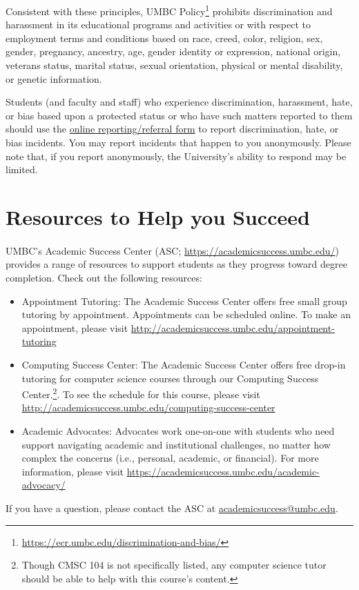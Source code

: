 \documentclass[letter,10pt]{article}
\begin{document}
Consistent with these principles, UMBC Policy\footnote{\url{https://ecr.umbc.edu/discrimination-and-bias/}} prohibits discrimination and harassment in its educational programs and activities or with respect to employment terms and conditions based on race, creed, color, religion, sex, gender, pregnancy, ancestry, age, gender identity or expression, national origin, veterans status, marital status, sexual orientation, physical or mental disability, or genetic information.

Students (and faculty and staff) who experience discrimination, harassment, hate, or bias based upon a protected status or who have such matters reported to them should use the \href{https://umbc-advocate.symplicity.com/titleix_report/index.php/pid954154?}{online reporting/referral form} to report discrimination, hate, or bias incidents. You may report incidents that happen to you anonymously. Please note that, if you report anonymously, the University’s ability to respond may be limited.

\section*{Resources to Help you Succeed}
\paragraph{}UMBC’s Academic Success Center (ASC; \url{https://academicsuccess.umbc.edu/}) provides a range of resources to support students as they progress toward degree completion. Check out the following resources:

\begin{itemize}
\item Appointment Tutoring: The Academic Success Center offers free small group tutoring by appointment. Appointments can be scheduled online. To make an appointment, please visit \url{http://academicsuccess.umbc.edu/appointment-tutoring}

\item Computing Success Center: The Academic Success Center offers free drop-in tutoring for computer science courses through our Computing Success Center.\footnote{Though CMSC 104 is not specifically listed, any computer science tutor should be able to help with this course's content.}. 
 To see the schedule for this course, please visit \url{http://academicsuccess.umbc.edu/computing-success-center}

\item Academic Advocates: Advocates work one-on-one with students who need support navigating academic and institutional challenges, no matter how complex the concerns (i.e., personal, academic, or financial).  For more information, please visit \url{https://academicsuccess.umbc.edu/academic-advocacy/}

\end{itemize}

If you have a question, please contact the ASC at \href{mailto:academicsuccess@umbc.edu}{academicsuccess@umbc.edu}.
\end{document}
